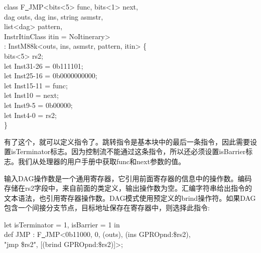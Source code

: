 \begin{tcolorbox}[colback=white,colframe=black]
class F\underline{~}JMP<bits<5> func, bits<1> next, \\
\hspace*{3cm}dag outs, dag ins, string asmstr, \\
\hspace*{3cm}list<dag> pattern, \\
\hspace*{3cm}InstrItinClass itin = NoItinerary> \\
\hspace*{1.3cm}: InstM88k<outs, ins, asmstr, pattern, itin> \{ \\
\hspace*{1cm}bits<5> rs2; \\
\hspace*{1cm}let Inst{31-26} = 0b111101; \\
\hspace*{1cm}let Inst{25-16} = 0b0000000000; \\
\hspace*{1cm}let Inst{15-11} = func; \\
\hspace*{1cm}let Inst{10} = next; \\
\hspace*{1cm}let Inst{9-5} = 0b00000; \\
\hspace*{1cm}let Inst{4-0} = rs2; \\
\}
\end{tcolorbox}

有了这个，就可以定义指令了。跳转指令是基本块中的最后一条指令，因此需要设置isTerminator标志。因为控制流不能通过这条指令，所以还必须设置isBarrier标志。我们从处理器的用户手册中获取func和next参数的值。\par

输入DAG操作数是一个通用寄存器，它引用前面寄存器的信息中的操作数。编码存储在rs2字段中，来自前面的类定义，输出操作数为空。汇编字符串给出指令的文本语法，也引用寄存器操作数。DAG模式使用预定义的brind操作符。如果DAG包含一个间接分支节点，目标地址保存在寄存器中，则选择此指令:\par

\begin{tcolorbox}[colback=white,colframe=black]
let isTerminator = 1, isBarrier = 1 in \\
\hspace*{1cm}def JMP : F\underline{~}JMP<0b11000, 0, (outs), (ins GPROpnd:\$rs2), \\
\hspace*{4cm}"jmp \$rs2", [(brind GPROpnd:\$rs2)]>;
\end{tcolorbox}


